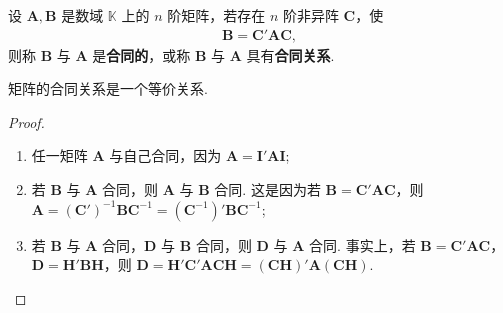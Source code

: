 \documentclass[../../main.tex]{subfiles}
\begin{document}
\begin{definition}[矩阵的合同关系]\label{definition:矩阵的合同关系}
设 $\boldsymbol{A},\boldsymbol{B}$ 是数域 $\mathbb{K}$ 上的 $n$ 阶矩阵，若存在 $n$ 阶非异阵 $\boldsymbol{C}$，使
\begin{align*}
\boldsymbol{B}=\boldsymbol{C}'\boldsymbol{A}\boldsymbol{C},
\end{align*}
则称 $\boldsymbol{B}$ 与 $\boldsymbol{A}$ 是\textbf{合同的}，或称 $\boldsymbol{B}$ 与 $\boldsymbol{A}$ 具有\textbf{合同关系}.
\end{definition}

\begin{theorem}
矩阵的合同关系是一个等价关系.
\end{theorem}
\begin{proof}
\begin{enumerate}
\item 任一矩阵 $\boldsymbol{A}$ 与自己合同，因为 $\boldsymbol{A}=\boldsymbol{I}'\boldsymbol{A}\boldsymbol{I}$;
\item 若 $\boldsymbol{B}$ 与 $\boldsymbol{A}$ 合同，则 $\boldsymbol{A}$ 与 $\boldsymbol{B}$ 合同. 这是因为若 $\boldsymbol{B}=\boldsymbol{C}'\boldsymbol{A}\boldsymbol{C}$，则 $\boldsymbol{A}=(\boldsymbol{C}')^{-1}\boldsymbol{B}\boldsymbol{C}^{-1}=(\boldsymbol{C}^{-1})'\boldsymbol{B}\boldsymbol{C}^{-1}$;
\item 若 $\boldsymbol{B}$ 与 $\boldsymbol{A}$ 合同，$\boldsymbol{D}$ 与 $\boldsymbol{B}$ 合同，则 $\boldsymbol{D}$ 与 $\boldsymbol{A}$ 合同. 事实上，若 $\boldsymbol{B}=\boldsymbol{C}'\boldsymbol{A}\boldsymbol{C}$，$\boldsymbol{D}=\boldsymbol{H}'\boldsymbol{B}\boldsymbol{H}$，则 $\boldsymbol{D}=\boldsymbol{H}'\boldsymbol{C}'\boldsymbol{A}\boldsymbol{C}\boldsymbol{H}=(\boldsymbol{C}\boldsymbol{H})'\boldsymbol{A}(\boldsymbol{C}\boldsymbol{H})$.
\end{enumerate} 

\end{proof}
\end{document}
